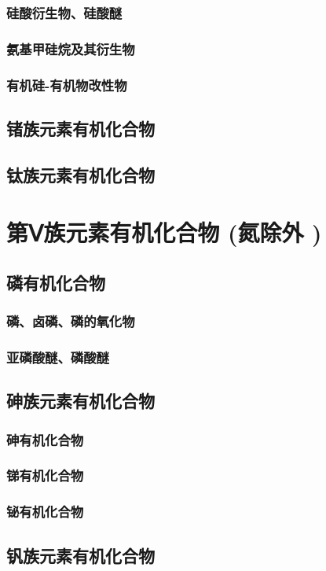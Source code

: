 \documentclass[UTF8]{../03-Chemistry}
\begin{document}
        \subsubsection{硅酸衍生物、硅酸醚}
        \subsubsection{氨基甲硅烷及其衍生物}
        \subsubsection{有机硅-有机物改性物}
    \subsection{锗族元素有机化合物}
    \subsection{钛族元素有机化合物}
\section{第Ⅴ族元素有机化合物 (氮除外 )}
    \subsection{磷有机化合物}
        \subsubsection{磷、卤磷、磷的氧化物}
        \subsubsection{亚磷酸醚、磷酸醚}
    \subsection{砷族元素有机化合物}
        \subsubsection{砷有机化合物}
        \subsubsection{锑有机化合物}
        \subsubsection{铋有机化合物}
    \subsection{钒族元素有机化合物}
\end{document}
